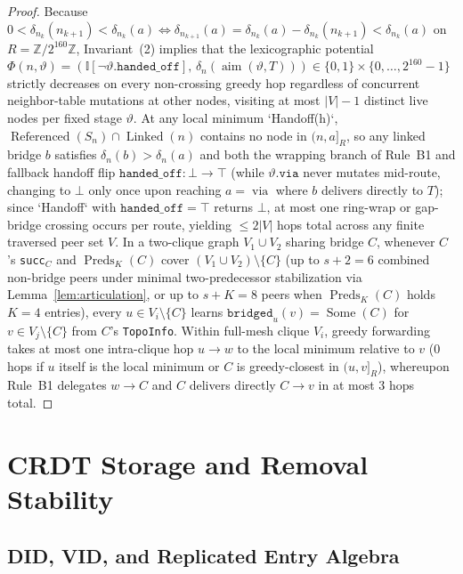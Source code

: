 \documentclass[journal]{IEEEtran}
\begin{document}
\begin{proof}
Because $0<\delta_{n_k}(n_{k+1})<\delta_{n_k}(a)\iff \delta_{n_{k+1}}(a)=\delta_{n_k}(a)-\delta_{n_k}(n_{k+1})<\delta_{n_k}(a)$ on $R=\mathbb{Z}/2^{160}\mathbb{Z}$, Invariant~(2) implies that the lexicographic potential $\Phi(n,\vartheta)=(\mathbb{I}[\neg\vartheta.\texttt{handed\_off}],\,\delta_n(\operatorname{aim}(\vartheta,T)))\in\{0,1\}\times\{0,\dots,2^{160}-1\}$ strictly decreases on every non-crossing greedy hop regardless of concurrent neighbor-table mutations at other nodes, visiting at most $|V|-1$ distinct live nodes per fixed stage $\vartheta$.
At any local minimum `Handoff(h)`, $\operatorname{Referenced}(S_n)\cap\operatorname{Linked}(n)$ contains no node in $(n,a]_R$, so any linked bridge $b$ satisfies $\delta_n(b)>\delta_n(a)$ and both the wrapping branch of Rule~B1 and fallback handoff flip $\texttt{handed\_off}:\bot\to\top$ (while $\vartheta.\texttt{via}$ never mutates mid-route, changing to $\bot$ only once upon reaching $a=\operatorname{via}$ where $b$ delivers directly to $T$); since `Handoff` with $\texttt{handed\_off}=\top$ returns $\bot$, at most one ring-wrap or gap-bridge crossing occurs per route, yielding $\le 2|V|$ hops total across any finite traversed peer set $V$.  In a
two-clique graph $V_1\cup V_2$ sharing bridge $C$, whenever $C$'s \texttt{succ}$_C$ and $\operatorname{Preds}_K(C)$ cover $(V_1\cup V_2)\setminus\{C\}$ (up to $s+2=6$ combined non-bridge peers under minimal two-predecessor stabilization via Lemma~\ref{lem:articulation}, or up to $s+K=8$ peers when $\operatorname{Preds}_K(C)$ holds $K=4$ entries), every $u\in V_i\setminus\{C\}$ learns $\texttt{bridged}_u(v)=\operatorname{Some}(C)$ for $v\in V_j\setminus\{C\}$ from $C$'s \texttt{TopoInfo}. Within full-mesh clique $V_i$, greedy forwarding takes at most one intra-clique hop $u\to w$ to the local minimum relative to $v$ ($0$ hops if $u$ itself is the local minimum or $C$ is greedy-closest in $(u,v]_R$), whereupon Rule~B1 delegates $w\to C$ and $C$ delivers directly $C\to v$ in at most $3$ hops total.
\end{proof}

\section{CRDT Storage and Removal Stability}\label{sec:storage}

\subsection{DID, VID, and Replicated Entry Algebra}
\end{document}
